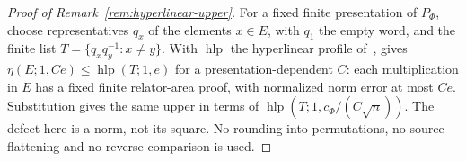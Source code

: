 \begin{proof}[Proof of Remark~\ref{rem:hyperlinear-upper}]
For a fixed finite presentation of $P_\Phi$, choose representatives
$q_x$ of the elements $x\in E$, with $q_1$ the empty word, and the finite list
$T=\{q_xq_y^{-1}:x\ne y\}$. With $\operatorname{hlp}$ the hyperlinear profile
of~\cite[Definition~2.3]{SlofstraVidick2018},
\cite[Proposition~7.2(b)]{SlofstraVidick2018} gives
$\eta(E;1,Ce)\leq\operatorname{hlp}(T;1,e)$ for a
presentation-dependent $C$: each multiplication in $E$ has a fixed finite
relator-area proof, with normalized norm error at most $Ce$.
Substitution gives the same upper in terms of
$\operatorname{hlp}(T;1,c_\Phi/(C\sqrt n))$.
The defect here is a norm, not its square. No rounding into
permutations, no source flattening and no reverse comparison is used.
\end{proof}
